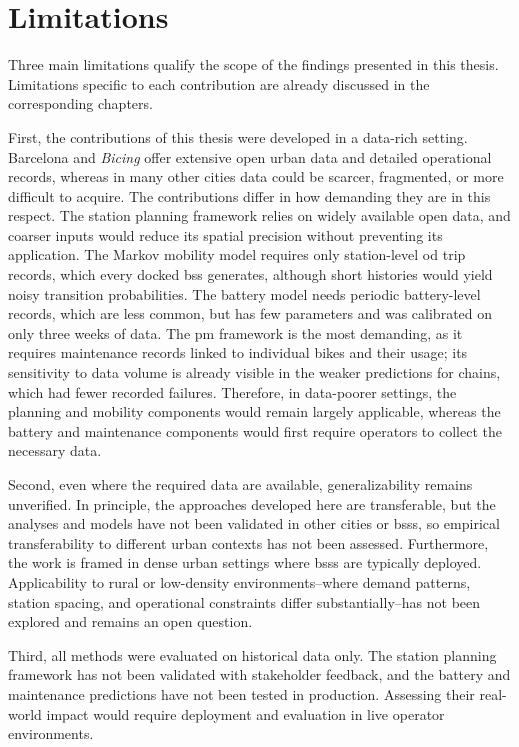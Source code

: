 \section{Limitations}
\label{sec:conclusions_limitations}

Three main limitations qualify the scope of the findings presented in this thesis. Limitations specific to each contribution are already discussed in the corresponding chapters.

First, the contributions of this thesis were developed in a data-rich setting. Barcelona and \textit{Bicing} offer extensive open urban data and detailed operational records, whereas in many other cities data could be scarcer, fragmented, or more difficult to acquire. The contributions differ in how demanding they are in this respect. The station planning framework relies on widely available open data, and coarser inputs would reduce its spatial precision without preventing its application. The Markov mobility model requires only station-level \ac{od} trip records, which every docked \ac{bss} generates, although short histories would yield noisy transition probabilities. The battery model needs periodic battery-level records, which are less common, but has few parameters and was calibrated on only three weeks of data. The \ac{pm} framework is the most demanding, as it requires maintenance records linked to individual bikes and their usage; its sensitivity to data volume is already visible in the weaker predictions for chains, which had fewer recorded failures. Therefore, in data-poorer settings, the planning and mobility components would remain largely applicable, whereas the battery and maintenance components would first require operators to collect the necessary data.

Second, even where the required data are available, generalizability remains unverified. In principle, the approaches developed here are transferable, but the analyses and models have not been validated in other cities or \acp{bss}, so empirical transferability to different urban contexts has not been assessed. Furthermore, the work is framed in dense urban settings where \acp{bss} are typically deployed. Applicability to rural or low-density environments--where demand patterns, station spacing, and operational constraints differ substantially--has not been explored and remains an open question.

Third, all methods were evaluated on historical data only. The station planning framework has not been validated with stakeholder feedback, and the battery and maintenance predictions have not been tested in production. Assessing their real-world impact would require deployment and evaluation in live operator environments.
